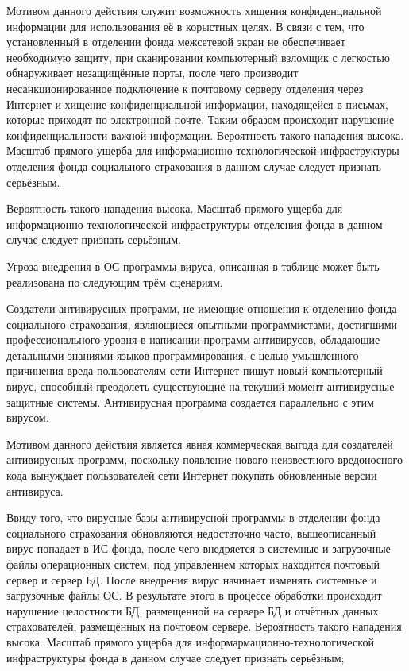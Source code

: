 Мотивом данного действия служит возможность хищения конфиденциальной
информации для использования её в корыстных целях. В связи с тем, что
установленный в отделении фонда межсетевой экран не обеспечивает
необходимую защиту, при сканировании компьютерный взломщик с легкостью
обнаруживает незащищённые порты, после чего производит
несанкционированное подключение к почтовому серверу отделения через
Интернет и хищение конфиденциальной информации, находящейся в письмах,
которые приходят по электронной почте. Таким образом происходит
нарушение конфиденциальности важной информации. Вероятность такого
нападения высока. Масштаб прямого ущерба для
информационно-технологической инфраструктуры отделения фонда
социального страхования в данном случае следует признать серьёзным.

Вероятность такого нападения высока. Масштаб прямого ущерба для
информационно-технологической инфраструктуры отделения \linebreak
фонда в данном случае следует признать серьёзным.

\point Угроза внедрения в ОС программы-вируса, описанная в таблице
может быть реализована по следующим трём сценариям.

\point Создатели антивирусных программ, не имеющие отношения к
отделению фонда социального страхования, являющиеся опытными
программистами, достигшими профессионального уровня в написании
программ-антивирусов, обладающие детальными знаниями \linebreak языков
программирования, с целью умышленного причинения вреда пользователям
сети Интернет пишут новый компьютерный вирус, способный преодолеть
существующие на текущий момент антивирусные защитные
системы. Антивирусная программа создается параллельно с этим вирусом.

Мотивом данного действия является явная коммерческая выгода для
создателей антивирусных программ, поскольку появление нового
неизвестного вредоносного кода вынуждает пользователей сети Интернет
покупать обновленные версии антивируса.

Ввиду того, что вирусные базы антивирусной программы в отделении фонда
социального страхования обновляются недостаточно часто, вышеописанный
вирус попадает в ИС фонда, после чего внедряется в системные и
загрузочные файлы операционных систем, под управлением которых
находится почтовый сервер и сервер БД. После внедрения вирус начинает
изменять системные и загрузочные файлы ОС. В результате этого в
процессе обработки происходит нарушение целостности БД, размещенной на
сервере БД и отчётных данных страхователей, размещённых на почтовом
сервере. Вероятность такого нападения высока. Масштаб прямого ущерба
для информармацион\-но-технологической инфраструктуры фонда в данном случае
следует признать серьёзным;

